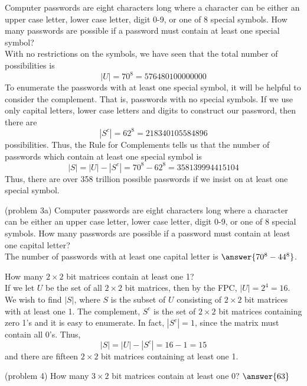 \documentclass[handout]{ximera}
\begin{document}
\begin{example}[example 3]
Computer passwords are eight characters long where a character can be either an upper case letter, 
lower case letter, digit 0-9, or one of 8 special symbols. 
How many passwords are possible if a password must contain at least one special symbol?\\
With no restrictions on the symbols, we have seen that the total number of possibilities is 
\[
|U| = 70^8 = 576480100000000
\]
To enumerate the passwords with at least one special symbol, it will be helpful to consider the complement. 
That is, passwords with no special symbols. If we use only capital letters, 
lower case letters and digits to construct our password, then there are
\[
|S^c| = 62^8 = 218340105584896
\]
possibilities. Thus, the Rule for Complements tells us that the number of passwords which contain at least one
special symbol is
\[
|S| = |U| - |S^c| = 70^8 - 62^8 = 358139994415104
\]
Thus, there are over 358 trillion possible passwords if we insist on at least one special symbol.
\end{example}

\begin{problem}(problem 3a)
Computer passwords are eight characters long where a character can be either an upper case letter, 
lower case letter, digit 0-9, or one of 8 special symbols. 
How many passwords are possible if a password must contain at least one capital letter?\\
The number of passwords with at least one capital letter is  $\answer{70^8 - 44^8}$.
\end{problem}


\begin{example}[example 4]
How many $2 \times 2$ bit matrices contain at least one 1?\\
If we let $U$ be the set of all $2 \times 2$ bit matrices, then by the FPC, $|U| = 2^4 = 16$. We wish to find $|S|$,
where $S$ is the subset of $U$ consisting of $2 \times 2$ bit matrices with at least one 1. The complement, $S^c$
is the set of $2 \times 2$ bit matrices containing zero 1's and it is easy to enumerate.  In fact, $|S^c|= 1$, since the matrix must contain all 0's. Thus,
\[
|S| = |U| - |S^c| = 16 -1 = 15
\]
and there are fifteen $2 \times 2$ bit matrices containing at least one 1.
\end{example}


\begin{problem}(problem 4)
How many $3 \times 2$ bit matrices contain at least one 0? \; $\answer{63}$
\end{problem}
\end{document}
